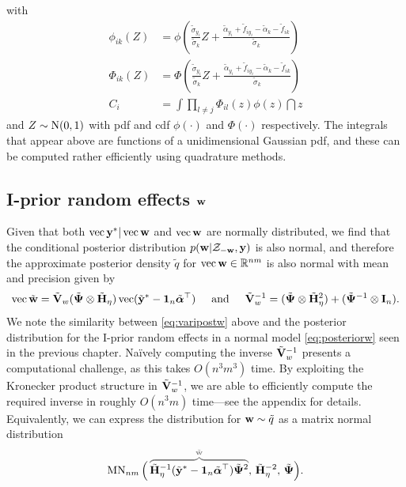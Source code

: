 with 
\begin{align*}
  \phi_{ik}(Z) &= \phi \left(\frac{\tilde\sigma_{y_i}}{\tilde\sigma_k} Z + \frac{\tilde\alpha_{y_i} + \tilde f_{iy_i} - \tilde\alpha_k - \tilde f_{ik}}{\tilde\sigma_k} \right) \\
  \Phi_{ik}(Z) &= \Phi \left(\frac{\tilde\sigma_{y_i}}{\tilde\sigma_k} Z + \frac{\tilde\alpha_{y_i} + \tilde f_{iy_i} - \tilde\alpha_k - \tilde f_{ik}}{\tilde\sigma_k} \right) \\
  C_i &= \int \prod_{l \neq j} \Phi_{il}(z) \phi(z) \dint z
\end{align*}
and $Z \sim \operatorname{N}(0,1)$ with pdf and cdf $\phi(\cdot)$ and $\Phi(\cdot)$ respectively. 
The integrals that appear above are functions of a unidimensional Gaussian pdf, and these can be computed rather efficiently using quadrature methods.

\subsection[I-prior random effects w]{I-prior random effects ${\mathbf w}$}

Given that both $\operatorname{vec} {\mathbf y}^* | \operatorname{vec} {\mathbf w}$ and $\operatorname{vec}{\mathbf w}$ are normally distributed, we find that the conditional posterior distribution $p({\mathbf w}|{\mathcal Z}_{-{\mathbf w}},{\mathbf y})$ is also normal, and therefore the approximate posterior density $\tilde q$ for $\operatorname{vec} {\mathbf w} \in \mathbb{R}^{nm}$ is also normal with mean and precision given by
\begin{gather}\label{eq:varipostw}
   \operatorname{vec} \tilde{{\mathbf w}} = \tilde{{\mathbf V}}_w 
    (\tilde{{\bm\Psi}} \otimes \tilde{{\mathbf H}}_\eta) \operatorname{vec} (\tilde{{\mathbf y}}^* - {\mathbf 1}_n\tilde{{\bm\alpha}}^\top)
  \hspace{0.5cm}\text{and}\hspace{0.5cm} 
  \tilde {{\mathbf V}}_w^{-1} = (\tilde{{\bm\Psi}} \otimes \tilde{{\mathbf H}}_\eta^2) + (\tilde{{\bm\Psi}}^{-1} \otimes {\mathbf I}_n).
\end{gather}
We note the similarity between \cref{eq:varipostw} above and the posterior distribution for the I-prior random effects in a normal model \cref{eq:posteriorw} seen in the previous chapter.
Naïvely computing the inverse $\tilde{{\mathbf V}}_w^{-1}$ presents a computational challenge, as this takes $O(n^3m^3)$ time. 
By exploiting the Kronecker product structure in $\tilde{{\mathbf V}}_w^{-1}$, we are able to efficiently compute the required inverse in roughly $O(n^3m)$ time---see the appendix for details.
Equivalently, we can express the distribution for ${\mathbf w} \sim \tilde q$ as a matrix normal distribution
\begin{align}\label{eq:varipostw2}
  \MN_{nm}\Big(\,
  \greyoverbrace{\tilde\bH_\eta^{-1}(\tilde\by^* - \bone_n\tilde\balpha^\top)\tilde\bPsi^2}{\tilde\bw} ,\, 
  \tilde\bH_\eta^{-2},\,
  \tilde\bPsi  
  \Big).
\end{align}

